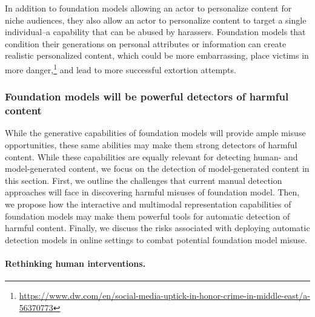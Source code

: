 In addition to foundation models allowing an actor to personalize content for niche audiences, they also allow an actor to personalize content to target a single individual--a capability that can be abused by harassers. Foundation models that condition their generations on personal attributes or information can create realistic personalized content, which could be more embarrassing, place victims in more danger,\footnote{\url{https://www.dw.com/en/social-media-uptick-in-honor-crime-in-middle-east/a-56370773}} and lead to more successful extortion attempts. 

\subsubsection{Foundation models will be powerful detectors of harmful content}

While the generative capabilities of foundation models will provide ample misuse opportunities, these same abilities may make them strong detectors of harmful content. While these capabilities are equally relevant for detecting human- and model-generated content, we focus on the detection of model-generated content in this section. First, we outline the challenges that current manual detection approaches will face in discovering harmful misuses of foundation model. Then, we propose how the interactive and multimodal representation capabilities of foundation models may make them powerful tools for automatic detection of harmful content. Finally, we discuss the risks associated with deploying automatic detection models in online settings to combat potential foundation model misuse.

\paragraph{Rethinking human interventions.} 

